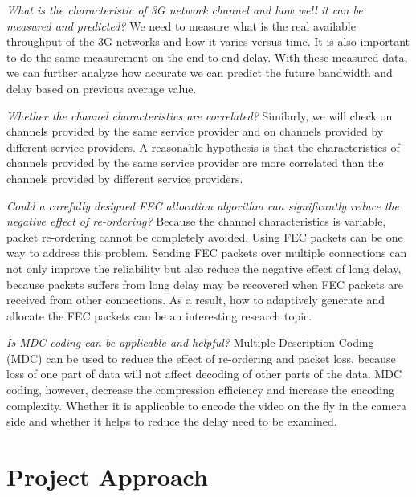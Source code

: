 \documentclass{article}
\begin{document}
    \emph{What is the characteristic of 3G network channel and 
    how well it can be measured and predicted?}
    We need to measure what is the real available throughput of
    the 3G networks and how it varies versus time. It is also
    important to do the same measurement on the end-to-end delay.
    With these measured data, we can further analyze how accurate 
    we can predict the future bandwidth and delay based on previous
    average value.
    

    \emph{Whether the channel characteristics are correlated?}
    Similarly, we will check on channels provided by the same
    service provider and on channels provided by different service providers.
    A reasonable hypothesis is that the characteristics of channels
    provided by the same service provider are more correlated than
    the channels provided by different service providers.

    \emph{Could a carefully designed FEC allocation algorithm can
    significantly reduce the negative effect of re-ordering?}
    Because the channel characteristics is variable, 
    packet re-ordering cannot be completely avoided. 
    Using FEC packets can be one way to address this problem.
    Sending FEC packets over multiple connections can not only
    improve the reliability but also reduce the negative effect of long delay,
    because packets suffers from long delay may be recovered when FEC packets
    are received from other connections. As a result, 
    how to adaptively generate and 
    allocate the FEC packets can be an interesting research topic.

    \emph{Is MDC coding can be applicable and helpful?}
    Multiple Description Coding (MDC) can be used to reduce the effect
    of re-ordering and packet loss, because loss of one part of data
    will not affect decoding of other parts of the data. 
    MDC coding, however, decrease the compression efficiency and increase
    the encoding complexity. Whether it is applicable to encode the 
    video on the fly in the camera side and whether it helps to 
    reduce the delay need to be examined. 
\section{Project Approach}
\end{document}
